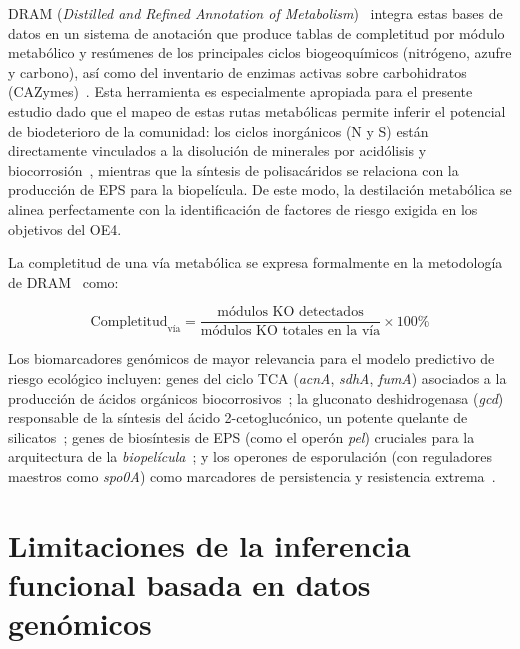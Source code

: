 DRAM (\textit{Distilled and Refined Annotation of
Metabolism})~\cite{dram2020} integra estas bases de datos en un sistema
de anotación que produce tablas de completitud por módulo metabólico y
resúmenes de los principales ciclos biogeoquímicos (nitrógeno, azufre y 
carbono), así como del inventario de enzimas activas sobre 
carbohidratos (CAZymes)~\cite{dram2020}. Esta herramienta es especialmente
apropiada para el presente estudio dado que el mapeo de estas rutas 
metabólicas permite inferir el potencial de biodeterioro de la comunidad: 
los ciclos inorgánicos (N y S) están directamente vinculados a la disolución de 
minerales por acidólisis y biocorrosión~\cite{zanardini2019, dakal2012}, mientras 
que la síntesis de polisacáridos se relaciona con la producción de EPS para 
la biopelícula. De este modo, la destilación metabólica se alinea 
perfectamente con la identificación de factores de riesgo exigida en los 
objetivos del OE4.

La completitud de una vía metabólica se expresa formalmente en la
metodología de DRAM~\cite{dram2020} como:

\begin{equation}
    \text{Completitud}_{\text{vía}} =
    \frac{\text{módulos KO detectados}}
         {\text{módulos KO totales en la vía}}
    \times 100\%
    \label{eq:pathway}
\end{equation}

Los biomarcadores genómicos de mayor relevancia para el modelo
predictivo de riesgo ecológico incluyen: genes del ciclo TCA
(\textit{acnA}, \textit{sdhA}, \textit{fumA}) asociados a la producción de
ácidos orgánicos biocorrosivos~\cite{cappitelli2020, zanardini2019}; la
gluconato deshidrogenasa (\textit{gcd}) responsable de la síntesis
del ácido 2-cetoglucónico, un potente quelante de silicatos~\cite{gutarowska2015};
genes de biosíntesis de EPS (como el operón \textit{pel}) cruciales
para la arquitectura de la \textit{biopelícula}~\cite{flemming2010}; y los
operones de esporulación (con reguladores maestros como \textit{spo0A})
como marcadores de persistencia y resistencia extrema~\cite{Galperin2022}.

\section{Limitaciones de la inferencia funcional basada en datos
  genómicos}
\label{sec:limitations}

